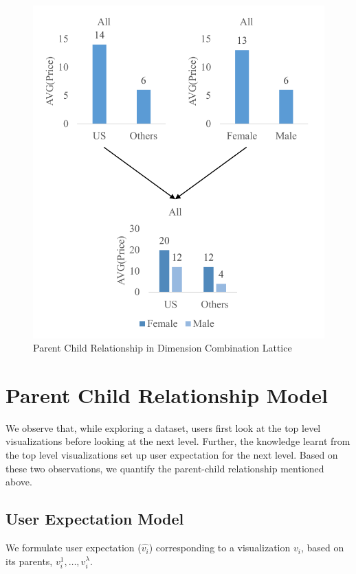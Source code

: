 \begin{figure}[bht]
\label{example}
\centering
\includegraphics[scale=0.75]{DimensionRelation.pdf}
\caption{Parent Child Relationship in Dimension Combination Lattice}
\end{figure}
 


\section{Parent Child Relationship Model} 
We observe that, while exploring a dataset, users first look at the top level visualizations before looking at the next level. Further, the knowledge learnt from the top level visualizations set up user expectation for the next level. Based on these two observations, we quantify the parent-child relationship mentioned above.  
  
\subsection{User Expectation Model}
We formulate user expectation ($\hat{v_i}$) corresponding to a visualization $v_i$, based on its parents, $v_i^1, \ldots, v_i^\lambda$. 
  
